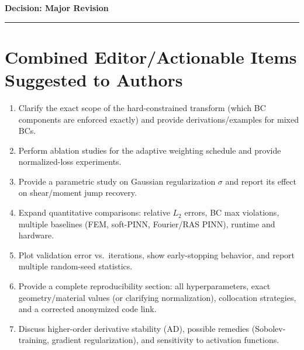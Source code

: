 \documentclass[11pt]{article}
\begin{document}
\textbf{Decision: Major Revision}

\vspace{12pt}
\hrule
\vspace{12pt}

\section*{Combined Editor/Actionable Items Suggested to Authors}
\begin{enumerate}
    \item Clarify the exact scope of the hard-constrained transform (which BC components are enforced exactly) and provide derivations/examples for mixed BCs.
    \item Perform ablation studies for the adaptive weighting schedule and provide normalized-loss experiments.
    \item Provide a parametric study on Gaussian regularization $\sigma$ and report its effect on shear/moment jump recovery.
    \item Expand quantitative comparisons: relative $L_2$ errors, BC max violations, multiple baselines (FEM, soft-PINN, Fourier/RAS PINN), runtime and hardware.
    \item Plot validation error vs.\ iterations, show early-stopping behavior, and report multiple random-seed statistics.
    \item Provide a complete reproducibility section: all hyperparameters, exact geometry/material values (or clarifying normalization), collocation strategies, and a corrected anonymized code link.
    \item Discuss higher-order derivative stability (AD), possible remedies (Sobolev-training, gradient regularization), and sensitivity to activation functions.
\end{enumerate}

\vfill
\end{document}
